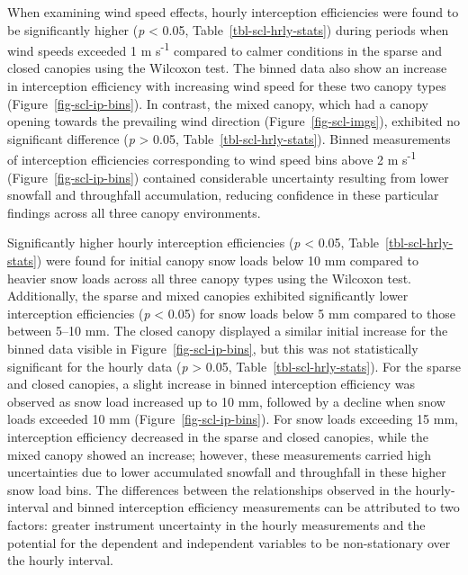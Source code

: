 \documentclass[
  letterpaper,
]{tex/uofsthesis-cs}
\begin{document}
When examining wind speed effects, hourly interception efficiencies were
found to be significantly higher (\emph{p} \textless{} 0.05,
Table~\ref{tbl-scl-hrly-stats}) during periods when wind speeds exceeded
1 m s\textsuperscript{-1} compared to calmer conditions in the sparse
and closed canopies using the Wilcoxon test. The binned data also show
an increase in interception efficiency with increasing wind speed for
these two canopy types (Figure~\ref{fig-scl-ip-bins}). In contrast, the
mixed canopy, which had a canopy opening towards the prevailing wind
direction (Figure~\ref{fig-scl-imgs}), exhibited no significant
difference (\emph{p} \textgreater{} 0.05,
Table~\ref{tbl-scl-hrly-stats}). Binned measurements of interception
efficiencies corresponding to wind speed bins above 2 m
s\textsuperscript{-1} (Figure~\ref{fig-scl-ip-bins}) contained
considerable uncertainty resulting from lower snowfall and throughfall
accumulation, reducing confidence in these particular findings across
all three canopy environments.

Significantly higher hourly interception efficiencies (\emph{p}
\textless{} 0.05, Table~\ref{tbl-scl-hrly-stats}) were found for initial
canopy snow loads below 10 mm compared to heavier snow loads across all
three canopy types using the Wilcoxon test. Additionally, the sparse and
mixed canopies exhibited significantly lower interception efficiencies
(\emph{p} \textless{} 0.05) for snow loads below 5 mm compared to those
between 5--10 mm. The closed canopy displayed a similar initial increase
for the binned data visible in Figure~\ref{fig-scl-ip-bins}, but this
was not statistically significant for the hourly data (\emph{p}
\textgreater{} 0.05, Table~\ref{tbl-scl-hrly-stats}). For the sparse and
closed canopies, a slight increase in binned interception efficiency was
observed as snow load increased up to 10 mm, followed by a decline when
snow loads exceeded 10 mm (Figure~\ref{fig-scl-ip-bins}). For snow loads
exceeding 15 mm, interception efficiency decreased in the sparse and
closed canopies, while the mixed canopy showed an increase; however,
these measurements carried high uncertainties due to lower accumulated
snowfall and throughfall in these higher snow load bins. The differences
between the relationships observed in the hourly-interval and binned
interception efficiency measurements can be attributed to two factors:
greater instrument uncertainty in the hourly measurements and the
potential for the dependent and independent variables to be
non-stationary over the hourly interval.
\end{document}
